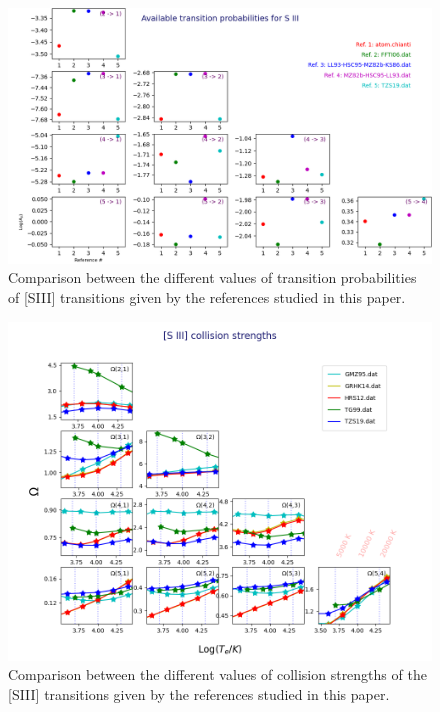 \documentclass[fleqn,usenatbib]{mnras}
\begin{document}
\begin{figure}
\includegraphics[width=\textwidth]{A_siii.png}
\caption{Comparison between the different values of transition probabilities of [S\thinspace III] transitions given by the references studied in this paper.}
\label{fig:A_sii}
\end{figure}

\begin{figure}
\includegraphics[width=\textwidth]{omega_siii_zoom.png}
\caption{Comparison between the different values of collision strengths of the [S\thinspace III] transitions given by the references studied in this paper.}
\label{fig:omega_siii_zoom }
\end{figure}
\end{document}
